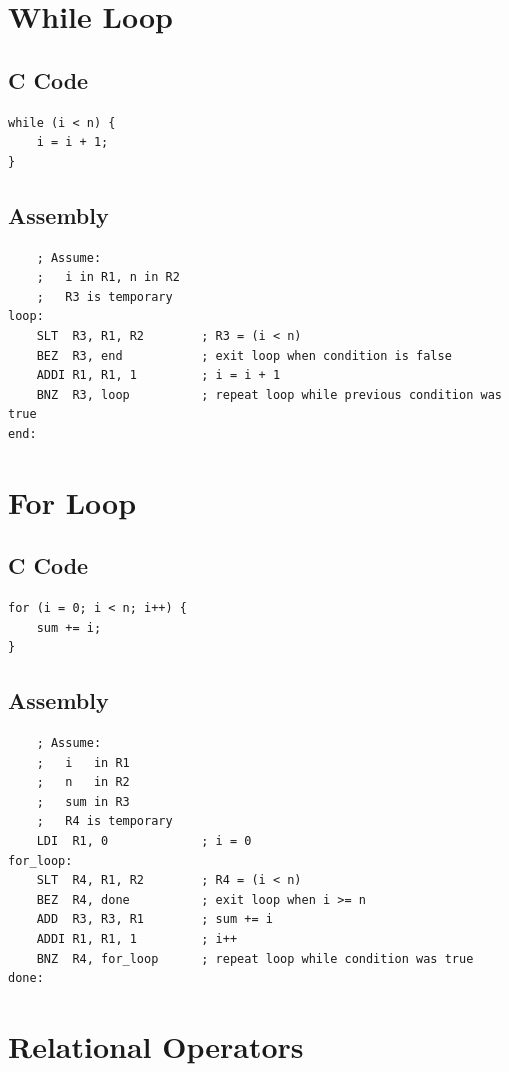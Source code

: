 \documentclass[12pt]{report}
\begin{document}
\section{While Loop}

\subsection*{C Code}
\begin{lstlisting}
while (i < n) {
    i = i + 1;
}
\end{lstlisting}

\subsection*{Assembly}
\begin{lstlisting}
    ; Assume:
    ;   i in R1, n in R2
    ;   R3 is temporary
loop:
    SLT  R3, R1, R2        ; R3 = (i < n)
    BEZ  R3, end           ; exit loop when condition is false
    ADDI R1, R1, 1         ; i = i + 1
    BNZ  R3, loop          ; repeat loop while previous condition was true
end:
\end{lstlisting}

\section{For Loop}

\subsection*{C Code}
\begin{lstlisting}
for (i = 0; i < n; i++) {
    sum += i;
}
\end{lstlisting}

\subsection*{Assembly}
\begin{lstlisting}
    ; Assume:
    ;   i   in R1
    ;   n   in R2
    ;   sum in R3
    ;   R4 is temporary
    LDI  R1, 0             ; i = 0
for_loop:
    SLT  R4, R1, R2        ; R4 = (i < n)
    BEZ  R4, done          ; exit loop when i >= n
    ADD  R3, R3, R1        ; sum += i
    ADDI R1, R1, 1         ; i++
    BNZ  R4, for_loop      ; repeat loop while condition was true
done:
\end{lstlisting}

\section{Relational Operators}
\end{document}
